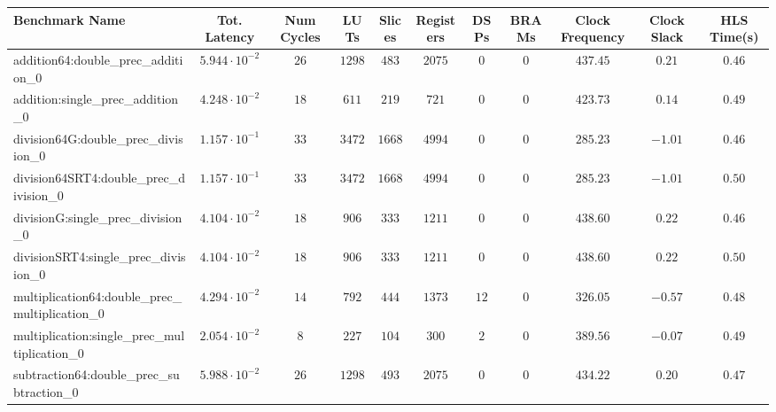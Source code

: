 \begin{tabular}{|l|c|c|c|c|c|c|c|c|c|c|}
\hline
Benchmark Name                                   & Tot. Latency            & Num Cycles & LUTs      & Slices   & Registers & DSPs   & BRAMs & Clock Frequency & Clock Slack & HLS Time(s) \\
\hline
addition64:double\_prec\_addition\_0             & $ 5.944 \cdot 10^{-2} $ & $ 26     $ & $ 1298  $ & $ 483  $ & $ 2075  $ & $ 0  $ & $ 0 $ & $ 437.45      $ & $ 0.21    $ & $ 0.46    $ \\
addition:single\_prec\_addition\_0               & $ 4.248 \cdot 10^{-2} $ & $ 18     $ & $ 611   $ & $ 219  $ & $ 721   $ & $ 0  $ & $ 0 $ & $ 423.73      $ & $ 0.14    $ & $ 0.49    $ \\
division64G:double\_prec\_division\_0            & $ 1.157 \cdot 10^{-1} $ & $ 33     $ & $ 3472  $ & $ 1668 $ & $ 4994  $ & $ 0  $ & $ 0 $ & $ 285.23      $ & $ -1.01   $ & $ 0.46    $ \\
division64SRT4:double\_prec\_division\_0         & $ 1.157 \cdot 10^{-1} $ & $ 33     $ & $ 3472  $ & $ 1668 $ & $ 4994  $ & $ 0  $ & $ 0 $ & $ 285.23      $ & $ -1.01   $ & $ 0.50    $ \\
divisionG:single\_prec\_division\_0              & $ 4.104 \cdot 10^{-2} $ & $ 18     $ & $ 906   $ & $ 333  $ & $ 1211  $ & $ 0  $ & $ 0 $ & $ 438.60      $ & $ 0.22    $ & $ 0.46    $ \\
divisionSRT4:single\_prec\_division\_0           & $ 4.104 \cdot 10^{-2} $ & $ 18     $ & $ 906   $ & $ 333  $ & $ 1211  $ & $ 0  $ & $ 0 $ & $ 438.60      $ & $ 0.22    $ & $ 0.50    $ \\
multiplication64:double\_prec\_multiplication\_0 & $ 4.294 \cdot 10^{-2} $ & $ 14     $ & $ 792   $ & $ 444  $ & $ 1373  $ & $ 12 $ & $ 0 $ & $ 326.05      $ & $ -0.57   $ & $ 0.48    $ \\
multiplication:single\_prec\_multiplication\_0   & $ 2.054 \cdot 10^{-2} $ & $ 8      $ & $ 227   $ & $ 104  $ & $ 300   $ & $ 2  $ & $ 0 $ & $ 389.56      $ & $ -0.07   $ & $ 0.49    $ \\
subtraction64:double\_prec\_subtraction\_0       & $ 5.988 \cdot 10^{-2} $ & $ 26     $ & $ 1298  $ & $ 493  $ & $ 2075  $ & $ 0  $ & $ 0 $ & $ 434.22      $ & $ 0.20    $ & $ 0.47    $ \\

\end{tabular}
